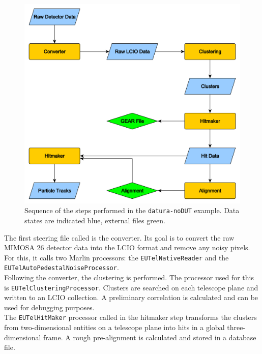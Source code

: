 \begin{figure}[hbt]
\centering
\includegraphics[width=\textwidth]{figures/datura-noDUT.pdf}
\caption[Steps performed in the \texttt{datura-noDUT} example]{Sequence of the
steps performed in the \texttt{datura-noDUT} example. Data states are indicated
blue, external files green.}
\label{fig:datura-nodutsequence}
\end{figure}

The first steering file called is the converter. Its goal is to convert the raw
MIMOSA 26 detector data into the LCIO format and remove any noisy pixels. For
this, it calls two Marlin processors: the \texttt{EUTelNativeReader} and the
\texttt{EUTelAutoPede\-stalNoiseProcessor}.\\

Following the converter, the clustering is performed. The processor used for
this is \texttt{EUTelClusteringProcessor}. Clusters are searched on each
telescope plane and written to an LCIO collection. A preliminary correlation is
calculated and can be used for debugging purposes.\\

The \texttt{EUTelHitMaker} processor called in the hitmaker step transforms the
clusters from two-dimensional entities on a telescope plane into hits in a
global three-dimensional frame. A rough pre-alignment is calculated and stored
in a database file.\\

